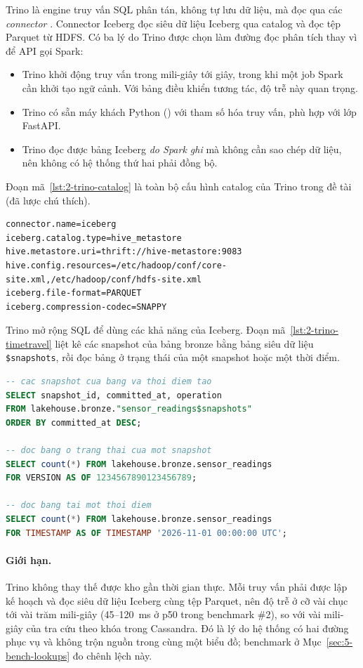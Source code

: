 Trino là engine truy vấn SQL phân tán, không tự lưu dữ liệu, mà đọc qua các \emph{connector} \cite{trino_docs}. Connector Iceberg đọc siêu dữ liệu Iceberg qua catalog và đọc tệp Parquet từ HDFS. Có ba lý do Trino được chọn làm đường đọc phân tích thay vì để API gọi Spark:

\begin{itemize}
  \item Trino khởi động truy vấn trong mili-giây tới giây, trong khi một job Spark cần khởi tạo ngữ cảnh. Với bảng điều khiển tương tác, độ trễ này quan trọng.
  \item Trino có sẵn máy khách Python () với tham số hóa truy vấn, phù hợp với lớp FastAPI.
  \item Trino đọc được bảng Iceberg \emph{do Spark ghi} mà không cần sao chép dữ liệu, nên không có hệ thống thứ hai phải đồng bộ.
\end{itemize}

Đoạn mã~\ref{lst:2-trino-catalog} là toàn bộ cấu hình catalog của Trino trong đề tài (đã lược chú thích).

\begin{lstlisting}[caption={Catalog Iceberg của Trino (\texttt{trino/catalog/lakehouse.properties})}, label={lst:2-trino-catalog}]
connector.name=iceberg
iceberg.catalog.type=hive_metastore
hive.metastore.uri=thrift://hive-metastore:9083
hive.config.resources=/etc/hadoop/conf/core-site.xml,/etc/hadoop/conf/hdfs-site.xml
iceberg.file-format=PARQUET
iceberg.compression-codec=SNAPPY
\end{lstlisting}

Trino mở rộng SQL để dùng các khả năng của Iceberg. Đoạn mã~\ref{lst:2-trino-timetravel} liệt kê các snapshot của bảng bronze bằng bảng siêu dữ liệu \texttt{\$snapshots}, rồi đọc bảng ở trạng thái của một snapshot hoặc một thời điểm.

\begin{lstlisting}[language=SQL, caption={Du hành thời gian trong Trino (cú pháp của connector Iceberg)}, label={lst:2-trino-timetravel}]
-- cac snapshot cua bang va thoi diem tao
SELECT snapshot_id, committed_at, operation
FROM lakehouse.bronze."sensor_readings$snapshots"
ORDER BY committed_at DESC;

-- doc bang o trang thai cua mot snapshot
SELECT count(*) FROM lakehouse.bronze.sensor_readings
FOR VERSION AS OF 1234567890123456789;

-- doc bang tai mot thoi diem
SELECT count(*) FROM lakehouse.bronze.sensor_readings
FOR TIMESTAMP AS OF TIMESTAMP '2026-11-01 00:00:00 UTC';
\end{lstlisting}

\paragraph{Giới hạn.} Trino không thay thế được kho gần thời gian thực. Mỗi truy vấn phải được lập kế hoạch và đọc siêu dữ liệu Iceberg cùng tệp Parquet, nên độ trễ ở cỡ vài chục tới vài trăm mili-giây (45--120~ms ở p50 trong benchmark \#2), so với vài mili-giây của tra cứu theo khóa trong Cassandra. Đó là lý do hệ thống có hai đường phục vụ và không trộn nguồn trong cùng một biểu đồ; benchmark ở Mục~\ref{sec:5-bench-lookups} đo chênh lệch này.

